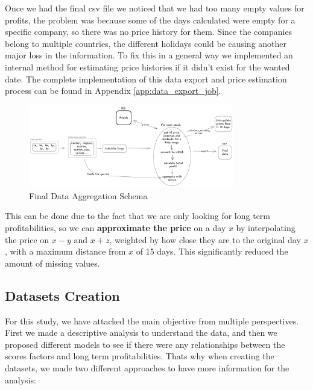 \documentclass[11pt,english,a4paper,hidelinks]{book}
\begin{document}
\noindent Once we had the final csv file we noticed that we had too many empty values for profits, the problem was because some of the days calculated were empty for a specific company, so there was no price history for them. Since the companies belong to multiple countries, the different holidays could be causing another major loss in the information. To fix this in a general way we implemented an internal method for estimating price histories if it didn't exist for the wanted date. The complete implementation of this data export and price estimation process can be found in Appendix \ref{app:data_export_job}.

\begin{figure}[H]
    \centering
    \includegraphics[width=0.8\textwidth]{images/tweenvest/Final Data Aggregation Schema.png}
    \caption{Final Data Aggregation Schema}
    \label{fig:final_data_aggregation_schema}
\end{figure}

\noindent This can be done due to the fact that we are only looking for long term profitabilities, so we can \textbf{approximate the price} on a day $x$ by interpolating the price on $x-y$ and $x+z$, weighted by how close they are to the original day $x$, with a maximum distance from $x$ of 15 days. This significantly reduced the amount of missing values.

\subsection{Datasets Creation}

For this study, we have attacked the main objective from multiple perspectives. First we made a descriptive analysis to understand the data, and then we proposed different models to see if there were any relationships between the scores factors and long term profitabilities. Thats why when creating the datasets, we made two different approaches to have more information for the analysis:
\end{document}
